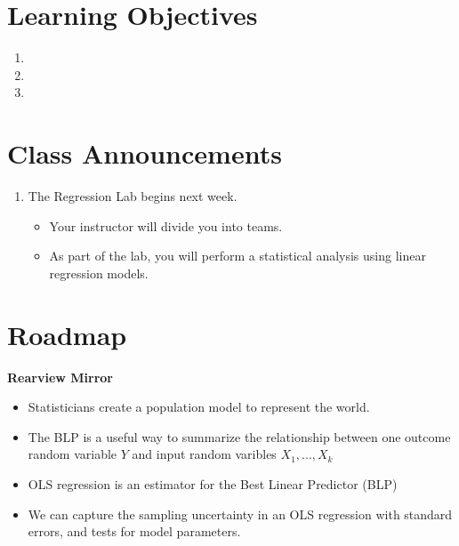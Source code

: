 \documentclass[
]{book}
\providecommand{\tightlist}{%
  \setlength{\itemsep}{0pt}\setlength{\parskip}{0pt}}
\theoremstyle{definition}
\theoremstyle{definition}
\theoremstyle{definition}
\theoremstyle{definition}
\theoremstyle{remark}
\begin{document}
\hypertarget{learning-objectives-9}{%
\section{Learning Objectives}\label{learning-objectives-9}}

\begin{enumerate}
\def\labelenumi{\arabic{enumi}.}
\tightlist
\item
\item
\item
\end{enumerate}

\hypertarget{class-announcements-8}{%
\section{Class Announcements}\label{class-announcements-8}}

\begin{enumerate}
\def\labelenumi{\arabic{enumi}.}
\tightlist
\item
  The Regression Lab begins next week.

  \begin{itemize}
  \tightlist
  \item
    Your instructor will divide you into teams.
  \item
    As part of the lab, you will perform a statistical analysis using linear regression models.
  \end{itemize}
\end{enumerate}

\hypertarget{roadmap-6}{%
\section{Roadmap}\label{roadmap-6}}

\textbf{Rearview Mirror}

\begin{itemize}
\item
  Statisticians create a population model to represent the world.
\item
  The BLP is a useful way to summarize the relationship between one outcome random variable \(Y\) and input random varibles \(X_1,...,X_k\)
\item
  OLS regression is an estimator for the Best Linear Predictor (BLP)
\item
  We can capture the sampling uncertainty in an OLS regression with standard errors, and tests for model parameters.
\end{itemize}
\end{document}
